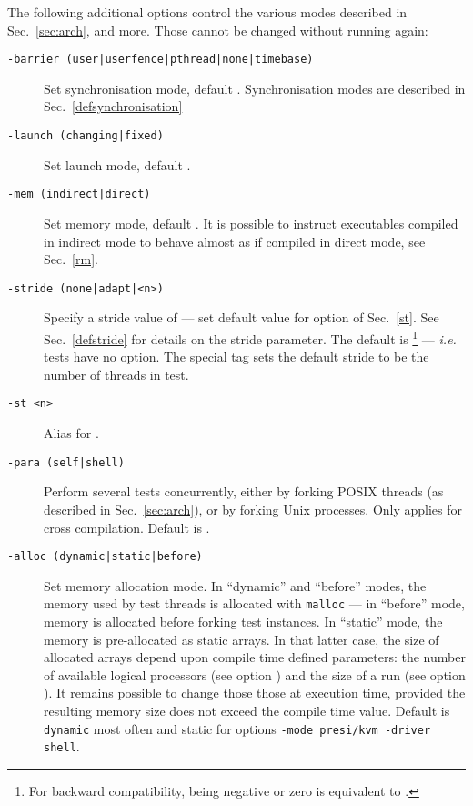 The following additional options control the various modes described
in Sec.~\ref{sec:arch}, and more.
Those cannot be changed without running \litmus{} again:
\begin{description}
\item[{\tt -barrier (user|userfence|pthread|none|timebase)}] Set synchronisation mode, default . Synchronisation modes are described
in Sec.~\ref{defsynchronisation}
\item[{\tt -launch (changing|fixed)}] Set launch mode,
default .
\item[{\tt -mem (indirect|direct)}] Set memory mode,
default .
It is possible to instruct executables compiled in indirect mode
to behave almost as if compiled in direct mode, see Sec.~\ref{rm}.
\item[{\tt -stride (none|adapt|<n>)}]
Specify a stride value of  --- set default value for option  of Sec.~\ref{st}. See Sec.~\ref{defstride} for details on the stride parameter.
The default is \footnote{For backward compatibility,  being negative or zero is equivalent to .}
--- \emph{i.e.} tests have no
 option. The special tag  sets the default
stride to be the number of threads in test.

\item[{\tt -st <n>}] Alias for .
\item[{\tt -para (self|shell)}]
Perform several tests concurrently, either by forking POSIX
threads (as described in Sec.~\ref{sec:arch}), or by forking
Unix processes. Only applies for cross compilation.
Default is .
\item[{\tt -alloc (dynamic|static|before)}]
Set memory allocation mode. In ``dynamic'' and ``before'' modes, the memory
used by test threads is allocated with \texttt{malloc} --- in ``before'' mode,
memory is allocated before forking test instances.
In ``static'' mode, the memory is pre-allocated as static arrays.
In that latter case, the size of allocated arrays depend upon
compile time defined parameters: the number of available logical processors
(see option )
and the size of a run (see option ).
It remains possible to change those those at execution time, provided
the resulting memory size does not exceed the compile time value.
Default is \texttt{dynamic} most often and
static for options \texttt{-mode presi/kvm -driver shell}.


\end{description}
